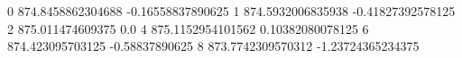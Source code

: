 0 874.8458862304688 -0.16558837890625
1 874.5932006835938 -0.41827392578125
2 875.011474609375 0.0
4 875.1152954101562 0.10382080078125
6 874.423095703125 -0.58837890625
8 873.7742309570312 -1.23724365234375
